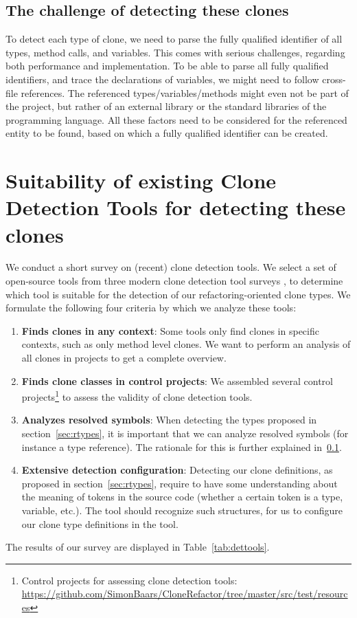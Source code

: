 \subsection{The challenge of detecting these clones}\label{chap:challenge}
To detect each type of clone, we need to parse the fully qualified identifier of all types, method calls, and variables. This comes with serious challenges, regarding both performance and implementation. To be able to parse all fully qualified identifiers, and trace the declarations of variables, we might need to follow cross-file references. The referenced types/variables/methods might even not be part of the project, but rather of an external library or the standard libraries of the programming language. All these factors need to be considered for the referenced entity to be found, based on which a fully qualified identifier can be created.

\section{Suitability of existing Clone Detection Tools for detecting these clones} \label{ch:tool-overview}
We conduct a short survey on (recent) clone detection tools. We select a set of open-source tools from three modern clone detection tool surveys \cite{roy2009comparison, svajlenko2014evaluating, sheneamer2016survey}, to determine which tool is suitable for the detection of our refactoring-oriented clone types. We formulate the following four criteria by which we analyze these tools:
\begin{enumerate}
    \item \textbf{Finds clones in any context}: Some tools only find clones in specific contexts, such as only method level clones. We want to perform an analysis of all clones in projects to get a complete overview.
\item \textbf{Finds clone classes in control projects}: We assembled several control projects\footnote{Control projects for assessing clone detection tools: \url{https://github.com/SimonBaars/CloneRefactor/tree/master/src/test/resources}} to assess the validity of clone detection tools.
\item \textbf{Analyzes resolved symbols}: When detecting the types proposed in section~\ref{sec:rtypes}, it is important that we can analyze resolved symbols (for instance a type reference). The rationale for this is further explained in~\ref{chap:challenge}.
\item \textbf{Extensive detection configuration}: Detecting our clone definitions, as proposed in section~\ref{sec:rtypes}, require to have some understanding about the meaning of tokens in the source code (whether a certain token is a type, variable, etc.). The tool should recognize such structures, for us to configure our clone type definitions in the tool.
\end{enumerate}
The results of our survey are displayed in Table~\ref{tab:dettools}.

